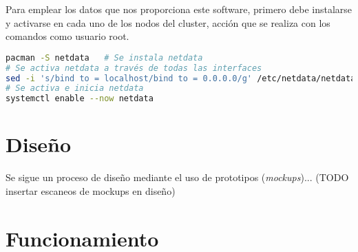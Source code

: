 Para emplear los datos que nos proporciona este software, primero debe instalarse y activarse en cada uno de los nodos del cluster, acción que se realiza con los comandos como usuario root.

\begin{lstlisting}[language=bash]
pacman -S netdata   # Se instala netdata
# Se activa netdata a través de todas las interfaces
sed -i 's/bind to = localhost/bind to = 0.0.0.0/g' /etc/netdata/netdata.conf
# Se activa e inicia netdata
systemctl enable --now netdata

\end{lstlisting}


\section{Diseño}
Se sigue un proceso de diseño mediante el uso de prototipos (\textit{mockups})... (TODO insertar escaneos de mockups en diseño)

\section{Funcionamiento}
